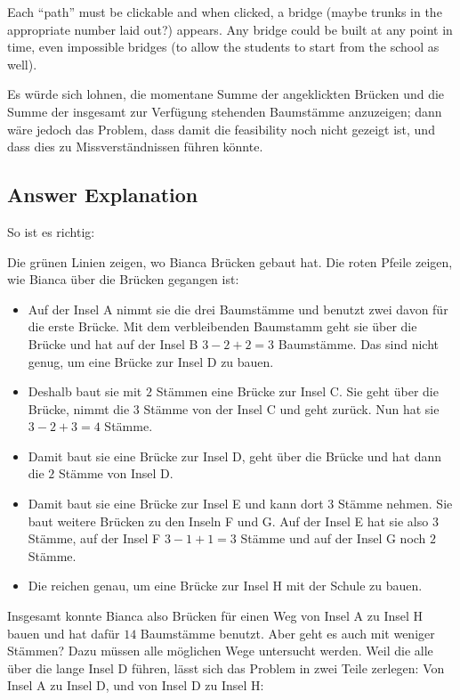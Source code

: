 \documentclass[a4paper,11pt]{report}
\newcommand{\taskGraphicsFolder}{..}
\begin{document}
Each \enquote{path} must be clickable and when clicked, a bridge (maybe trunks in the appropriate number laid out?) appears. Any bridge could be built at any point in time, even impossible bridges (to allow the students to start from the school as well).

Es würde sich lohnen, die momentane Summe der angeklickten Brücken und die Summe der insgesamt zur Verfügung stehenden Baumstämme anzuzeigen; dann wäre jedoch das Problem, dass damit die feasibility noch nicht gezeigt ist, und dass dies zu Missverständnissen führen könnte.

\endgroup

\subsection*{Answer Explanation}

So ist es richtig:

{\centering%
\par}

Die grünen Linien zeigen, wo Bianca Brücken gebaut hat.  Die roten Pfeile zeigen, wie Bianca über die Brücken gegangen ist:

\begin{itemize}
  \item Auf der Insel A nimmt sie die drei Baumstämme und benutzt zwei davon für die erste Brücke. Mit dem verbleibenden Baumstamm geht sie über die Brücke und hat auf der Insel B ${3 - 2 + 2 = 3}$ Baumstämme.  Das sind nicht genug, um eine Brücke zur Insel D zu bauen.
  \item Deshalb baut sie mit $2$ Stämmen eine Brücke zur Insel C.  Sie geht über die Brücke, nimmt die $3$ Stämme von der Insel C und geht zurück.  Nun hat sie ${3 - 2 + 3 = 4}$ Stämme.
  \item Damit baut sie eine Brücke zur Insel D, geht über die Brücke und hat dann die $2$ Stämme von Insel D.
  \item Damit baut sie eine Brücke zur Insel E und kann dort $3$ Stämme nehmen.  Sie baut weitere Brücken zu den Inseln F und G.  Auf der Insel E hat sie also $3$ Stämme, auf der Insel F ${3 - 1 + 1 = 3}$ Stämme und auf der Insel G noch $2$ Stämme.
  \item Die reichen genau, um eine Brücke zur Insel H mit der Schule zu bauen.
\end{itemize}

Insgesamt konnte Bianca also Brücken für einen Weg von Insel A zu Insel H bauen und hat dafür $14$ Baumstämme benutzt.  Aber geht es auch mit weniger Stämmen?  Dazu müssen alle möglichen Wege untersucht werden.  Weil die alle über die lange Insel D führen, lässt sich das Problem in zwei Teile zerlegen: Von Insel A zu Insel D, und von Insel D zu Insel H:
\end{document}
